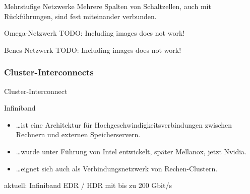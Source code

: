 \begin{defi}{Mehrstufige Netzwerke}
    Mehrere Spalten von Schaltzellen, auch mit Rückführungen, 
    sind fest miteinander verbunden.
\end{defi}

\begin{defi}{Omega-Netzwerk}
    TODO: Including images does not work!
\end{defi}

\begin{defi}{Benes-Netzwerk}
    TODO: Including images does not work!
\end{defi}

\subsubsection{Cluster-Interconnects}

\begin{defi}{Cluster-Interconnect}
    
\end{defi}

\begin{defi}{Infiniband}
    \begin{itemize}
        \item \ldots ist eine Architektur für Hochgeschwindigkeitsverbindungen zwischen Rechnern und externen Speicherservern.
        \item \ldots wurde unter Führung von Intel entwickelt, später Mellanox, jetzt Nvidia.
        \item \ldots eignet sich auch als Verbindungsnetzwerk von Rechen-Clustern.
    \end{itemize}
    aktuell: Infiniband EDR / HDR mit bis zu 200 Gbit/s
\end{defi}

